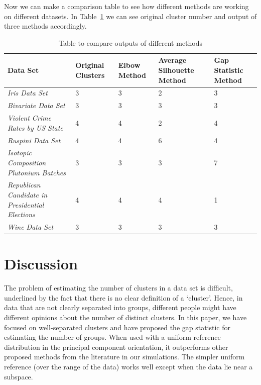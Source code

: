 \newpage

Now we can make a comparison table to see how different methods are working on different datasets. In Table~\ref{table:1}
we can see original cluster number and output of three methods accordingly.

\begin{table}[h]
 \caption{Table to compare outputs of different methods}
 \begin{tabular}{|C{8.1cm}|C{1.5cm}|C{1.3cm}|C{1.8cm}|C{1.4cm}|}
 \hline
  Data Set & Original Clusters & Elbow Method & Average Silhouette Method & Gap Statistic Method \\ [0.5ex]
 \hline
 \textit{Iris Data Set} & 3 & 3 & 2 & 3 \\
 \hline
 \textit{Bivariate Data Set} & 3 & 3 & 3 & 3 \\
 \hline
 \textit{Violent Crime Rates by US State} & 4 & 4 & 2 & 4 \\
 \hline
 \textit{Ruspini Data Set} & 4 & 4 & 6 & 4 \\
 \hline
 \textit{Isotopic Composition Plutonium Batches} & 3 & 3 & 3 & 7 \\
 \hline
 \textit{Republican Candidate in Presidential Elections} & 4 & 4 & 4 & 1 \\
 \hline
 \textit{Wine Data Set} & 3 & 3 & 3 & 3 \\
 \hline
\end{tabular}
\label{table:1}
\end{table}


\section{Discussion}
The problem of estimating the number of clusters in a data set is difficult, underlined by the
fact that there is no clear definition of a `cluster'. Hence, in data that are not clearly separated
into groups, different people might have different opinions about the number of distinct
clusters. In this paper, we have focused on well-separated clusters and have proposed the
gap statistic for estimating the number of groups. When used with a uniform reference
distribution in the principal component orientation, it outperforms other proposed methods
from the literature in our simulations. The simpler uniform reference (over the range of the
data) works well except when the data lie near a subspace.

